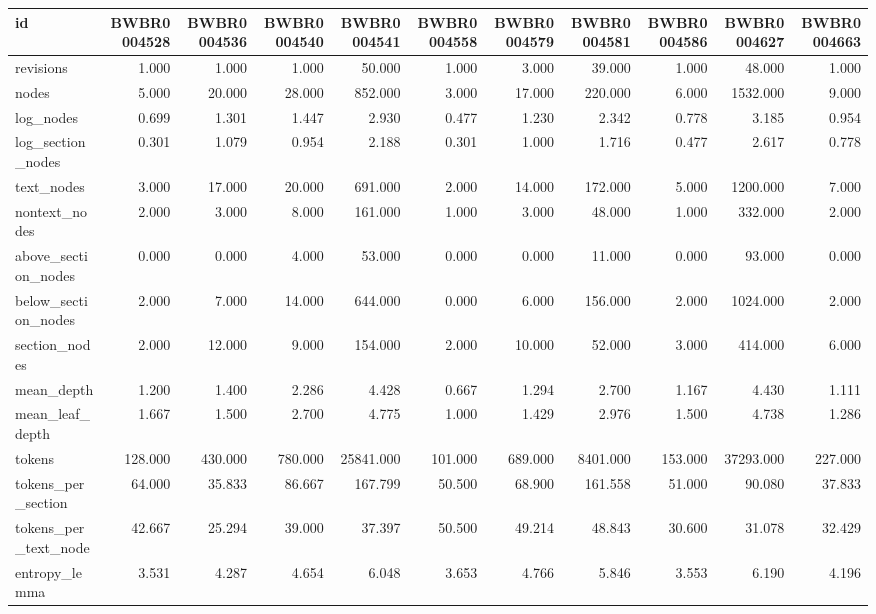 \begin{tabular}{lrrrrrrrrrr}
\toprule
id & BWBR0004528 & BWBR0004536 & BWBR0004540 & BWBR0004541 & BWBR0004558 & BWBR0004579 & BWBR0004581 & BWBR0004586 & BWBR0004627 & BWBR0004663 \\
\midrule
revisions & 1.000 & 1.000 & 1.000 & 50.000 & 1.000 & 3.000 & 39.000 & 1.000 & 48.000 & 1.000 \\
\cline{1-11}
nodes & 5.000 & 20.000 & 28.000 & 852.000 & 3.000 & 17.000 & 220.000 & 6.000 & 1532.000 & 9.000 \\
\cline{1-11}
log\_nodes & 0.699 & 1.301 & 1.447 & 2.930 & 0.477 & 1.230 & 2.342 & 0.778 & 3.185 & 0.954 \\
\cline{1-11}
log\_section\_nodes & 0.301 & 1.079 & 0.954 & 2.188 & 0.301 & 1.000 & 1.716 & 0.477 & 2.617 & 0.778 \\
\cline{1-11}
text\_nodes & 3.000 & 17.000 & 20.000 & 691.000 & 2.000 & 14.000 & 172.000 & 5.000 & 1200.000 & 7.000 \\
\cline{1-11}
nontext\_nodes & 2.000 & 3.000 & 8.000 & 161.000 & 1.000 & 3.000 & 48.000 & 1.000 & 332.000 & 2.000 \\
\cline{1-11}
above\_section\_nodes & 0.000 & 0.000 & 4.000 & 53.000 & 0.000 & 0.000 & 11.000 & 0.000 & 93.000 & 0.000 \\
\cline{1-11}
below\_section\_nodes & 2.000 & 7.000 & 14.000 & 644.000 & 0.000 & 6.000 & 156.000 & 2.000 & 1024.000 & 2.000 \\
\cline{1-11}
section\_nodes & 2.000 & 12.000 & 9.000 & 154.000 & 2.000 & 10.000 & 52.000 & 3.000 & 414.000 & 6.000 \\
\cline{1-11}
mean\_depth & 1.200 & 1.400 & 2.286 & 4.428 & 0.667 & 1.294 & 2.700 & 1.167 & 4.430 & 1.111 \\
\cline{1-11}
mean\_leaf\_depth & 1.667 & 1.500 & 2.700 & 4.775 & 1.000 & 1.429 & 2.976 & 1.500 & 4.738 & 1.286 \\
\cline{1-11}
tokens & 128.000 & 430.000 & 780.000 & 25841.000 & 101.000 & 689.000 & 8401.000 & 153.000 & 37293.000 & 227.000 \\
\cline{1-11}
tokens\_per\_section & 64.000 & 35.833 & 86.667 & 167.799 & 50.500 & 68.900 & 161.558 & 51.000 & 90.080 & 37.833 \\
\cline{1-11}
tokens\_per\_text\_node & 42.667 & 25.294 & 39.000 & 37.397 & 50.500 & 49.214 & 48.843 & 30.600 & 31.078 & 32.429 \\
\cline{1-11}
entropy\_lemma & 3.531 & 4.287 & 4.654 & 6.048 & 3.653 & 4.766 & 5.846 & 3.553 & 6.190 & 4.196 \\

\end{tabular}
